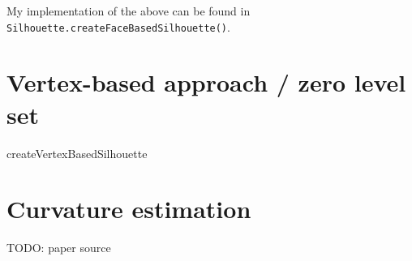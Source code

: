 \documentclass[a4paper,10pt,notitlepage]{scrreprt}
\begin{document}
My implementation of the above can be found in
\texttt{Silhouette.createFaceBasedSilhouette()}.

\chapter{Vertex-based approach / zero level set}

createVertexBasedSilhouette

\chapter{Curvature estimation}

TODO: paper source




\end{document}
